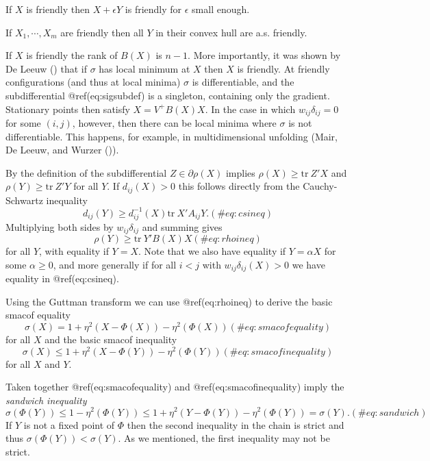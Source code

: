 \documentclass[
  12pt,
  letterpaper,
  DIV=11,
  numbers=noendperiod]{scrartcl}
\begin{document}
If \(X\) is friendly then \(X+\epsilon Y\) is friendly for \(\epsilon\)
small enough.

If \(X_1,\cdots,X_m\) are friendly then all \(Y\) in their convex hull
are a.s. friendly.

If \(X\) is friendly the rank of \(B(X)\) is \(n-1\). More importantly,
it was shown by De Leeuw () that if
\(\sigma\) has local minimum at \(X\) then \(X\) is friendly. At
friendly configurations (and thus at local minima) \(\sigma\) is
differentiable, and the subdifferential @ref(eq:sigsubdef) is a
singleton, containing only the gradient. Stationary points then satisfy
\(X=V^+B(X)X\). In the case in which \(w_{ij}\delta_{ij}=0\) for some
\((i,j)\), however, then there can be local minima where \(\sigma\) is
not differentiable. This happens, for example, in multidimensional
unfolding (Mair, De Leeuw, and Wurzer
()).

By the definition of the subdifferential \(Z\in\partial\rho(X)\) implies
\(\rho(X)\geq\text{tr}\ Z'X\) and \(\rho(Y)\geq\text{tr}\ Z'Y\) for all
\(Y\). If \(d_{ij}(X)>0\) this follows directly from the Cauchy-Schwartz
inequality \begin{equation}
d_{ij}(Y)\geq d_{ij}^{-1}(X)\text{tr}\ X'A_{ij}Y.
(\#eq:csineq)
\end{equation} Multiplying both sides by \(w_{ij}\delta_{ij}\) and
summing gives \begin{equation}
\rho(Y)\geq\text{tr}\ Y'B(X)X
(\#eq:rhoineq)
\end{equation} for all \(Y\), with equality if \(Y=X\). Note that we
also have equality if \(Y=\alpha X\) for some \(\alpha\geq 0\), and more
generally if for all \(i<j\) with \(w_{ij}\delta_{ij}(X)>0\) we have
equality in @ref(eq:csineq).

Using the Guttman transform we can use @ref(eq:rhoineq) to derive the
basic smacof equality \begin{equation}
\sigma(X)=1+\eta^2(X-\Phi(X))-\eta^2(\Phi(X))
(\#eq:smacofequality)
\end{equation} for all \(X\) and the basic smacof inequality
\begin{equation}
\sigma(X)\leq 1+\eta^2(X-\Phi(Y))-\eta^2(\Phi(Y))
(\#eq:smacofinequality)
\end{equation} for all \(X\) and \(Y\).

Taken together @ref(eq:smacofequality) and @ref(eq:smacofinequality)
imply the \emph{sandwich inequality} \begin{equation}
\sigma(\Phi(Y))\leq 1-\eta^2(\Phi(Y))\leq 1+\eta^2(Y-\Phi(Y))-\eta^2(\Phi(Y))=\sigma(Y).
(\#eq:sandwich)
\end{equation} If \(Y\) is not a fixed point of \(\Phi\) then the second
inequality in the chain is strict and thus
\(\sigma(\Phi(Y))<\sigma(Y)\). As we mentioned, the first inequality may
not be strict.
\end{document}
